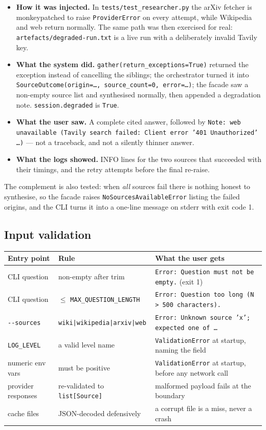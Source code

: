 \documentclass[11pt,a4paper]{article}
\begin{document}
\begin{itemize}[leftmargin=1.2em, itemsep=2pt]
  \item \textbf{How it was injected.} In \texttt{tests/test\_researcher.py} the arXiv fetcher is
  monkeypatched to raise \texttt{ProviderError} on every attempt, while Wikipedia and web return
  normally. The same path was then exercised for real: \texttt{artefacts/degraded-run.txt} is a live
  run with a deliberately invalid Tavily key.
  \item \textbf{What the system did.} \texttt{gather(return\_exceptions=True)} returned the
  exception instead of cancelling the siblings; the orchestrator turned it into
  \texttt{SourceOutcome(origin=\ldots, source\_count=0, error=\ldots)}; the facade saw a non-empty
  source list and synthesised normally, then appended a degradation note.
  \texttt{session.degraded} is \texttt{True}.
  \item \textbf{What the user saw.} A complete cited answer, followed by
  \texttt{Note: web unavailable (Tavily search failed: Client error '401 Unauthorized' \ldots)} ---
  not a traceback, and not a silently thinner answer.
  \item \textbf{What the logs showed.} INFO lines for the two sources that succeeded with their
  timings, and the retry attempts before the final re-raise.
\end{itemize}

The complement is also tested: when \emph{all} sources fail there is nothing honest to synthesise,
so the facade raises \texttt{NoSourcesAvailableError} listing the failed origins, and the CLI turns
it into a one-line message on stderr with exit code 1.

\subsection{Input validation}

\begin{tabularx}{\textwidth}{@{}p{3.0cm}p{5.2cm}X@{}}
\toprule
\textbf{Entry point} & \textbf{Rule} & \textbf{What the user gets} \\
\midrule
CLI question & non-empty after trim & \texttt{Error: Question must not be empty.} (exit 1) \\
CLI question & $\le$ \texttt{MAX\_QUESTION\_LENGTH} & \texttt{Error: Question too long (N > 500 characters).} \\
\texttt{-{}-sources} & \texttt{wiki|wikipedia|arxiv|web} & \texttt{Error: Unknown source 'x'; expected one of \ldots} \\
\texttt{LOG\_LEVEL} & a valid level name & \texttt{ValidationError} at startup, naming the field \\
numeric env vars & must be positive & \texttt{ValidationError} at startup, before any network call \\
provider responses & re-validated to \texttt{list[Source]} & malformed payload fails at the boundary \\
cache files & JSON-decoded defensively & a corrupt file is a miss, never a crash \\
\bottomrule
\end{tabularx}
\end{document}
